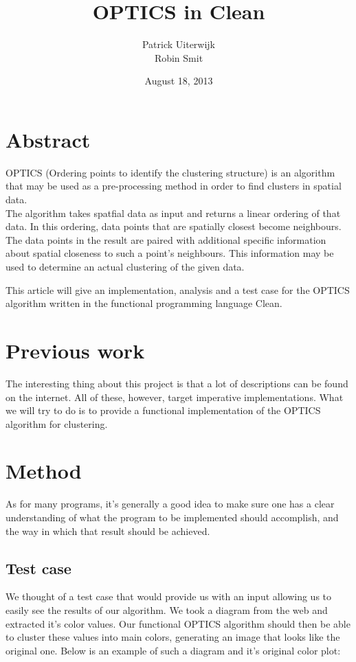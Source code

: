 \documentclass[12pt,a4paper]{article}
\title{OPTICS in Clean}
\date{August 18, 2013}
\author{Patrick Uiterwijk\\Robin Smit}
\begin{document}
\maketitle
\clearpage

\section*{Abstract}
OPTICS (Ordering points to identify the clustering structure) is an algorithm that may be used as a pre-processing method in order to find clusters in spatial data.\\
The algorithm takes spatfial data as input and returns a linear ordering of that data. In this ordering, data points that are spatially closest become neighbours.\\
The data points in the result are paired with additional specific information about spatial closeness to such a point's neighbours. This information may be used to determine an actual clustering of the given data.

This article will give an implementation, analysis and a test case for the OPTICS algorithm written in the functional programming language Clean.
\clearpage

\tableofcontents
\clearpage

\section{Previous work}
The interesting thing about this project is that a lot of descriptions can be found on the internet. All of these, however, target imperative implementations. What we will try to do is to provide a functional implementation of the OPTICS algorithm for clustering.

\clearpage
\section{Method}
As for many programs, it's generally a good idea to make sure one has a clear understanding of what the program to be implemented should accomplish, and the way in which that result should be achieved.

\subsection{Test case}
We thought of a test case that would provide us with an input allowing us to easily see the results of our algorithm. We took a diagram from the web and extracted it's color values. Our functional OPTICS algorithm should then be able to cluster these values into main colors, generating an image that looks like the original one. Below is an example of such a diagram and it's original color plot:\\
\end{document}
